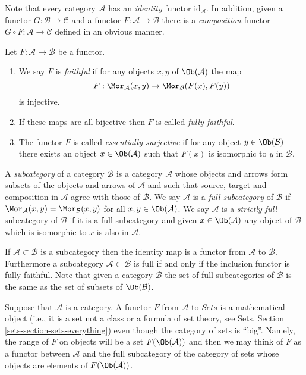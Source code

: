 \noindent
Note that every category $\mathcal{A}$ has an
{\it identity} functor $\text{id}_\mathcal{A}$.
In addition, given a functor $G : \mathcal{B} \to \mathcal{C}$
and a functor $F : \mathcal{A} \to \mathcal{B}$ there is
a {\it composition} functor $G \circ F : \mathcal{A} \to \mathcal{C}$
defined in an obvious manner.

\begin{definition}
\label{definition-faithful}
Let $F : \mathcal{A} \to \mathcal{B}$ be a functor.
\begin{enumerate}
\item We say $F$ is {\it faithful} if
for any objects $x, y$ of $\Ob(\mathcal{A})$ the map
$$
F : \Mor_\mathcal{A}(x, y) \to \Mor_\mathcal{B}(F(x), F(y))
$$
is injective.
\item If these maps are all bijective then $F$ is called
{\it fully faithful}.
\item
The functor $F$ is called {\it essentially surjective} if for any
object $y \in \Ob(\mathcal{B})$ there exists an object
$x \in \Ob(\mathcal{A})$ such that $F(x)$ is isomorphic to $y$ in
$\mathcal{B}$.
\end{enumerate}
\end{definition}

\begin{definition}
\label{definition-subcategory}
A {\it subcategory} of a category $\mathcal{B}$ is
a category $\mathcal{A}$ whose objects and arrows
form subsets of the objects and arrows
of $\mathcal{A}$ and such that source, target
and composition in $\mathcal{A}$ agree with those
of $\mathcal{B}$. We say $\mathcal{A}$ is a
{\it full subcategory} of $\mathcal{B}$ if $\Mor_\mathcal{A}(x, y)
= \Mor_\mathcal{B}(x, y)$ for all $x, y \in \Ob(\mathcal{A})$.
We say $\mathcal{A}$ is a {\it strictly full} subcategory of $\mathcal{B}$
if it is a full subcategory and given $x \in \Ob(\mathcal{A})$ any
object of $\mathcal{B}$ which is isomorphic to $x$ is also in $\mathcal{A}$.
\end{definition}

\noindent
If $\mathcal{A} \subset \mathcal{B}$ is a subcategory then the
identity map is a functor from $\mathcal{A}$ to $\mathcal{B}$.
Furthermore a subcategory $\mathcal{A} \subset \mathcal{B}$
is full if and only if the inclusion functor is fully faithful.
Note that given a category $\mathcal{B}$ the set of full subcategories
of $\mathcal{B}$ is the same as the set of subsets of
$\Ob(\mathcal{B})$.

\begin{remark}
\label{remark-functor-into-sets}
Suppose that $\mathcal{A}$ is a category.
A functor $F$ from $\mathcal{A}$ to $\textit{Sets}$
is a mathematical object (i.e., it is a set not a class or a formula
of set theory, see
Sets, Section \ref{sets-section-sets-everything})
even though the category of sets is ``big''.
Namely, the range of $F$ on objects will be
a set $F(\Ob(\mathcal{A}))$ and then we
may think of $F$ as a functor between
$\mathcal{A}$ and the full subcategory
of the category of sets whose
objects are elements of $F(\Ob(\mathcal{A}))$.
\end{remark}

